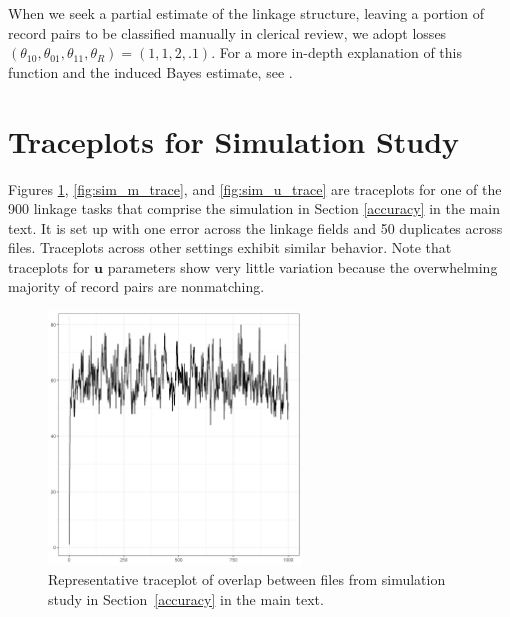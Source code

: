 \documentclass[ba,preprint]{imsart}
\begin{document}
When we seek a partial estimate of the linkage structure, leaving a portion of record pairs to be classified manually in clerical review, we adopt losses $(\theta_{10}, \theta_{01}, \theta_{11}, \theta_R) = (1, 1, 2, .1)$. For a more in-depth explanation of this function and the induced Bayes estimate, see \cite{sadinle_bayesian_2017}.
	
	\hypertarget{appendix-sim}{%
		\section{Traceplots for Simulation Study}\label{app:appendix-sim}}
	Figures \ref{fig:sim_overlap_trace}, \ref{fig:sim_m_trace}, and \ref{fig:sim_u_trace} are traceplots for one of the 900 linkage tasks that comprise the simulation in Section \ref{accuracy} in the main text. It is set up with one error across the linkage fields and 50 duplicates across files. Traceplots across other settings exhibit similar behavior. Note that traceplots for $\bm{u}$ parameters show very little variation because the overwhelming majority of record pairs are nonmatching.  
	
	\begin{figure}[h]
		\begin{center}
			\includegraphics[width=0.6\textwidth]{../notes/figures/sim_overlap_trace} 
			\caption{Representative traceplot of overlap between files from simulation study in Section~\ref{accuracy} in the main text.} \label{fig:sim_overlap_trace}
		\end{center}
	\end{figure}
	
\end{document}
